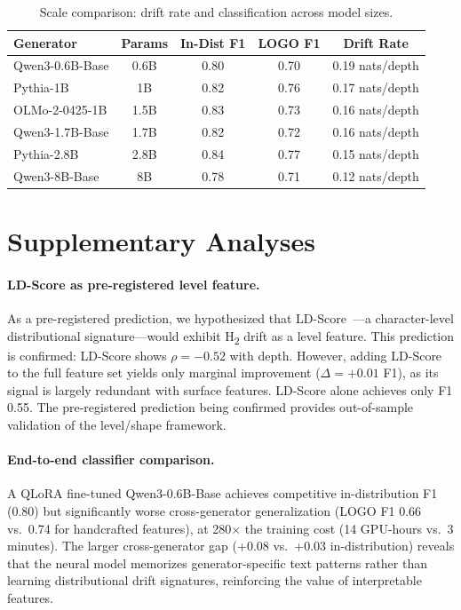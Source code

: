 \documentclass[letterpaper]{article}
\newcommand{\htwo}{H\textsubscript{2}}
\begin{document}
\begin{table}[t]
\centering
\caption{Scale comparison: drift rate and classification across model sizes.}
\label{tab:scale}
\begin{tabular}{lcccc}
\toprule
Generator & Params & In-Dist F1 & LOGO F1 & Drift Rate \\
\midrule
Qwen3-0.6B-Base & 0.6B & 0.80 & 0.70 & 0.19 nats/depth \\
Pythia-1B & 1B & 0.82 & 0.76 & 0.17 nats/depth \\
OLMo-2-0425-1B & 1.5B & 0.83 & 0.73 & 0.16 nats/depth \\
Qwen3-1.7B-Base & 1.7B & 0.82 & 0.72 & 0.16 nats/depth \\
Pythia-2.8B & 2.8B & 0.84 & 0.77 & 0.15 nats/depth \\
Qwen3-8B-Base & 8B & 0.78 & 0.71 & 0.12 nats/depth \\
\bottomrule
\end{tabular}
\end{table}

\section{Supplementary Analyses}

\paragraph{LD-Score as pre-registered level feature.}
As a pre-registered prediction, we hypothesized that LD-Score~\citep{tulchinskii2024ldscore}---a character-level distributional signature---would exhibit \htwo{} drift as a level feature.
This prediction is confirmed: LD-Score shows $\rho = -0.52$ with depth.
However, adding LD-Score to the full feature set yields only marginal improvement ($\Delta = +0.01$ F1), as its signal is largely redundant with surface features.
LD-Score alone achieves only F1 0.55.
The pre-registered prediction being confirmed provides out-of-sample validation of the level/shape framework.

\paragraph{End-to-end classifier comparison.}
A QLoRA fine-tuned Qwen3-0.6B-Base achieves competitive in-distribution F1 (0.80) but significantly worse cross-generator generalization (LOGO F1 0.66 vs.\ 0.74 for handcrafted features), at 280$\times$ the training cost (14 GPU-hours vs.\ 3 minutes).
The larger cross-generator gap (+0.08 vs.\ +0.03 in-distribution) reveals that the neural model memorizes generator-specific text patterns rather than learning distributional drift signatures, reinforcing the value of interpretable features.
\end{document}
